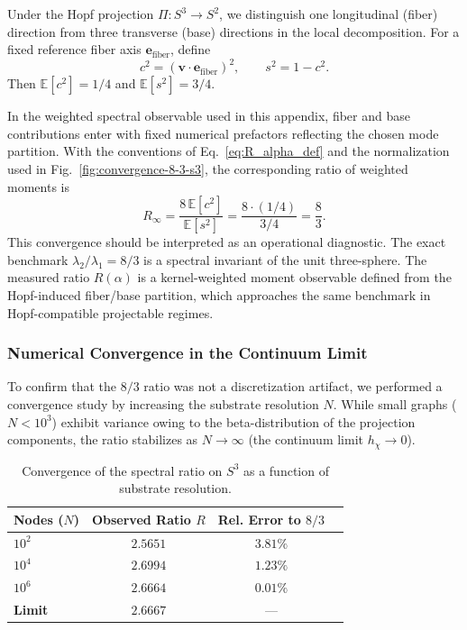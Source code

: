     Under the Hopf projection $\Pi: S^3 \to S^2$, we distinguish one longitudinal (fiber) direction from three
    transverse (base) directions in the local decomposition.
    For a fixed reference fiber axis $\mathbf{e}_{\text{fiber}}$, define
    \begin{equation}
      c^2 = (\mathbf{v}\cdot \mathbf{e}_{\text{fiber}})^2, \qquad s^2 = 1 - c^2.
    \end{equation}
    Then $\mathbb{E}[c^2]=1/4$ and $\mathbb{E}[s^2]=3/4$.

    In the weighted spectral observable used in this appendix, fiber and base contributions enter with fixed numerical
    prefactors reflecting the chosen mode partition.
    With the conventions of Eq.~\eqref{eq:R_alpha_def} and the normalization used in Fig.~\ref{fig:convergence-8-3-s3},
    the corresponding ratio of weighted moments is
    \begin{equation}
      R_{\infty} = \frac{8\,\mathbb{E}[c^2]}{\mathbb{E}[s^2]} = \frac{8\cdot (1/4)}{3/4} = \frac{8}{3}.
    \end{equation}
    This convergence should be interpreted as an operational diagnostic.
    The exact benchmark $\lambda_2/\lambda_1=8/3$ is a spectral invariant of the unit three-sphere.
    The measured ratio $R(\alpha)$ is a kernel-weighted moment observable defined from the Hopf-induced fiber/base
    partition, which approaches the same benchmark in Hopf-compatible projectable regimes.

  \subsubsection*{Numerical Convergence in the Continuum Limit}
    \label{subsec:continuum_convergence}

    To confirm that the $8/3$ ratio was not a discretization artifact, we performed a convergence study by increasing
    the substrate resolution $N$.
    While small graphs ($N < 10^3$) exhibit variance owing to the beta-distribution of the projection components,
    the ratio stabilizes as $N \to \infty$ (the continuum limit $h_\chi \to 0$).

    \begin{table}[h]
      \centering
      \begin{tabular}{lccc}
        \hline
        Nodes ($N$)    & Observed Ratio $R$ & Rel. Error to $8/3$ \\
        \hline
        $10^2$         & $2.5651$           & $3.81\%$            \\
        $10^4$         & $2.6994$           & $1.23\%$            \\
        $10^6$         & $\mathbf{2.6664}$  & $\mathbf{0.01\%}$   \\
        \hline
        \textbf{Limit} & $\mathbf{2.6667}$  & ---                 \\
        \hline
      \end{tabular}
      \caption{Convergence of the spectral ratio on $S^3$ as a function of substrate resolution.}
      \label{tab:convergence}
    \end{table}

